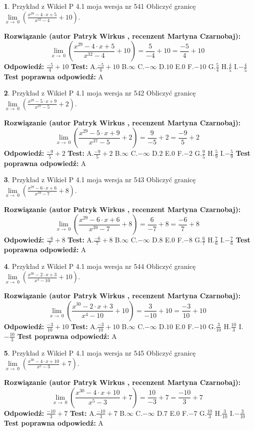 \documentclass[12pt, a4paper]{article}
\theoremstyle{definition} %
\newtheorem{zad}{}
\newcommand{\zadStart}[1]{\begin{zad}#1\newline}
\newcommand{\zadStop}{\end{zad}}
\newcommand{\rozwStart}[2]{\noindent \textbf{Rozwiązanie (autor #1 , recenzent #2): }\newline}
\newcommand{\rozwStop}{\newline}
\newcommand{\odpStart}{\noindent \textbf{Odpowiedź:}\newline}
\newcommand{\odpStop}{\newline}
\newcommand{\testStart}{\noindent \textbf{Test:}\newline}
\newcommand{\testStop}{\newline}
\newcommand{\kluczStart}{\noindent \textbf{Test poprawna odpowiedź:}\newline}
\newcommand{\kluczStop}{\newline}
\begin{document}
\zadStart{Przykład z Wikieł P 4.1 moja wersja nr 541}
Obliczyć granicę $\lim\limits_{x\to\ 0}(\frac{x^{29}-4 \cdot x +5}{x^{32}-4}+10)$.
\zadStop
\rozwStart{Patryk Wirkus}{Martyna Czarnobaj}
$$\lim\limits_{x\to\ 0}(\frac{x^{29}-4 \cdot x +5}{x^{32}-4}+10)=\frac{5}{-4}+10=\frac{-5}{4}+10$$
\rozwStop
\odpStart
$\frac{-5}{4}+10$
\odpStop
\testStart
A.$\frac{-5}{4}+10$
B.$\infty$
C.$-\infty$
D.$10$
E.$0$
F.$-10$
G.$\frac{5}{4}$
H.$\frac{4}{5}$
I.$-\frac{4}{5}$
\testStop
\kluczStart
A
\kluczStop



\zadStart{Przykład z Wikieł P 4.1 moja wersja nr 542}
Obliczyć granicę $\lim\limits_{x\to\ 0}(\frac{x^{29}-5 \cdot x +9}{x^{37}-5}+2)$.
\zadStop
\rozwStart{Patryk Wirkus}{Martyna Czarnobaj}
$$\lim\limits_{x\to\ 0}(\frac{x^{29}-5 \cdot x +9}{x^{37}-5}+2)=\frac{9}{-5}+2=\frac{-9}{5}+2$$
\rozwStop
\odpStart
$\frac{-9}{5}+2$
\odpStop
\testStart
A.$\frac{-9}{5}+2$
B.$\infty$
C.$-\infty$
D.$2$
E.$0$
F.$-2$
G.$\frac{9}{5}$
H.$\frac{5}{9}$
I.$-\frac{5}{9}$
\testStop
\kluczStart
A
\kluczStop



\zadStart{Przykład z Wikieł P 4.1 moja wersja nr 543}
Obliczyć granicę $\lim\limits_{x\to\ 0}(\frac{x^{29}-6 \cdot x +6}{x^{39}-7}+8)$.
\zadStop
\rozwStart{Patryk Wirkus}{Martyna Czarnobaj}
$$\lim\limits_{x\to\ 0}(\frac{x^{29}-6 \cdot x +6}{x^{39}-7}+8)=\frac{6}{-7}+8=\frac{-6}{7}+8$$
\rozwStop
\odpStart
$\frac{-6}{7}+8$
\odpStop
\testStart
A.$\frac{-6}{7}+8$
B.$\infty$
C.$-\infty$
D.$8$
E.$0$
F.$-8$
G.$\frac{6}{7}$
H.$\frac{7}{6}$
I.$-\frac{7}{6}$
\testStop
\kluczStart
A
\kluczStop



\zadStart{Przykład z Wikieł P 4.1 moja wersja nr 544}
Obliczyć granicę $\lim\limits_{x\to\ 0}(\frac{x^{30}-2 \cdot x +3}{x^{4}-10}+10)$.
\zadStop
\rozwStart{Patryk Wirkus}{Martyna Czarnobaj}
$$\lim\limits_{x\to\ 0}(\frac{x^{30}-2 \cdot x +3}{x^{4}-10}+10)=\frac{3}{-10}+10=\frac{-3}{10}+10$$
\rozwStop
\odpStart
$\frac{-3}{10}+10$
\odpStop
\testStart
A.$\frac{-3}{10}+10$
B.$\infty$
C.$-\infty$
D.$10$
E.$0$
F.$-10$
G.$\frac{3}{10}$
H.$\frac{10}{3}$
I.$-\frac{10}{3}$
\testStop
\kluczStart
A
\kluczStop



\zadStart{Przykład z Wikieł P 4.1 moja wersja nr 545}
Obliczyć granicę $\lim\limits_{x\to\ 0}(\frac{x^{30}-4 \cdot x +10}{x^{5}-3}+7)$.
\zadStop
\rozwStart{Patryk Wirkus}{Martyna Czarnobaj}
$$\lim\limits_{x\to\ 0}(\frac{x^{30}-4 \cdot x +10}{x^{5}-3}+7)=\frac{10}{-3}+7=\frac{-10}{3}+7$$
\rozwStop
\odpStart
$\frac{-10}{3}+7$
\odpStop
\testStart
A.$\frac{-10}{3}+7$
B.$\infty$
C.$-\infty$
D.$7$
E.$0$
F.$-7$
G.$\frac{10}{3}$
H.$\frac{3}{10}$
I.$-\frac{3}{10}$
\testStop
\kluczStart
A
\kluczStop
\end{document}
